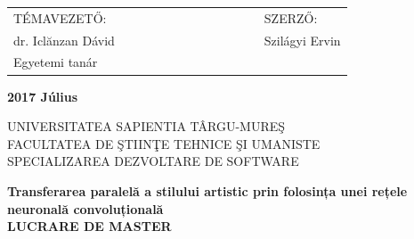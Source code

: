 \documentclass[12pt, a4paper, oneside]{book}
\theoremstyle{tetel}
\begin{document}
\vspace{2cm}
\begin{center}
\begin{tabular}{lcccccccccccl}
    TÉMAVEZETŐ:&&&&&&& &&&&&SZERZŐ:\\
     dr. Iclănzan Dávid&&&&&& &&&&&&Szilágyi Ervin\\
	Egyetemi tanár
\end{tabular}
\end{center}

\begin{center}
    \vspace{0.5cm}\textbf{2017 Július}
\end{center}
\vspace*{\fill}
\newpage
\thispagestyle{empty}
\begin{center}
    \Large UNIVERSITATEA SAPIENTIA TÂRGU-MURE\c{S}\\
    \Large FACULTATEA DE \c{S}TIIN\c{T}E TEHNICE \c{S}I UMANISTE\\
    \Large SPECIALIZAREA DEZVOLTARE DE SOFTWARE\\
\end{center}

\begin{center}
    \vspace{3cm}\LARGE \textbf{Transferarea paralelă a stilului artistic prin folosința unei rețele neuronală convoluțională}\\
    \vspace{1cm}\LARGE\textbf{LUCRARE DE MASTER}\\
\end{center}
\end{document}
